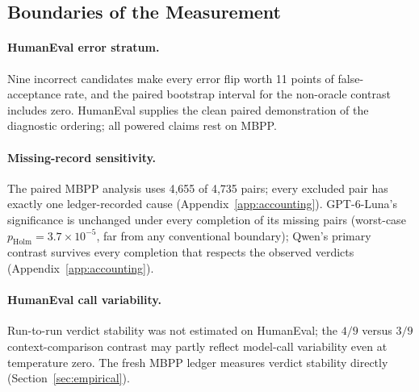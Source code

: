 \documentclass[a4paper,journal]{IAENGtran}
\begin{document}
\subsection{Boundaries of the Measurement}
\label{sec:threats}

\paragraph{HumanEval error stratum.} Nine incorrect candidates make every error flip
worth 11 points of false-acceptance rate, and the paired bootstrap interval for the
non-oracle contrast includes zero. HumanEval supplies the clean paired demonstration of
the diagnostic ordering; all powered claims rest on MBPP.

\paragraph{Missing-record sensitivity.} The paired MBPP analysis uses 4,655 of 4,735
pairs; every excluded pair has exactly one ledger-recorded cause
(Appendix~\ref{app:accounting}). GPT-6-Luna's significance is unchanged under every
completion of its missing pairs (worst-case
$p_{\mathrm{Holm}}=3.7\times10^{-5}$, far from any conventional boundary); Qwen's
primary contrast survives every completion that
respects the observed verdicts (Appendix~\ref{app:accounting}).

\paragraph{HumanEval call variability.} Run-to-run verdict stability was not estimated
on HumanEval; the $4/9$ versus $3/9$ context-comparison contrast may partly reflect
model-call variability even at temperature zero. The fresh MBPP ledger measures verdict
stability directly (Section~\ref{sec:empirical}).
\end{document}
